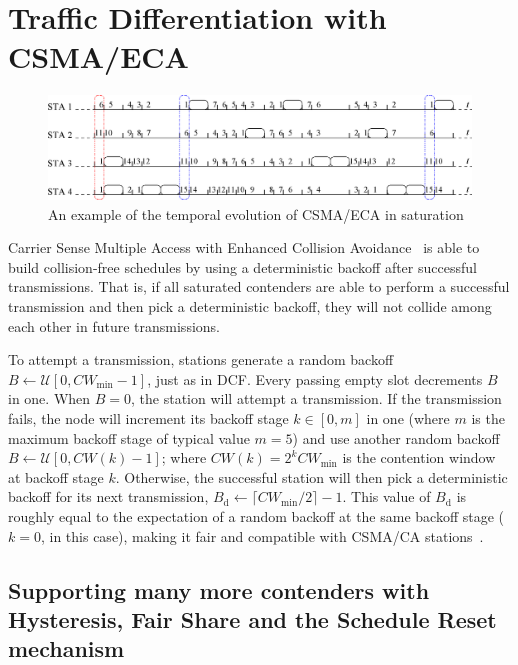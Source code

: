 \section{Traffic Differentiation with CSMA/ECA}\label{section3}

\begin{figure}[t!]
\centering
	\includegraphics[width=0.8\linewidth]{figures/csma_eca_different_backoff_short.eps}
	\caption{An example of the temporal evolution of CSMA/ECA in saturation}
	\label{fig:ECA}
\end{figure}
	
Carrier Sense Multiple Access with Enhanced Collision Avoidance~\cite{sanabria2014high, research2standards} is able to build collision-free schedules by using a deterministic backoff after successful transmissions. That is, if all saturated contenders are able to perform a successful transmission and then pick a deterministic backoff, they will not collide among each other in future transmissions.
	
To attempt a transmission, stations generate a random backoff $B\leftarrow\mathcal{U}[0,CW_{\min}-1]$, just as in DCF. Every passing empty slot decrements $B$ in one. When $B=0$, the station will attempt a transmission. If the transmission fails, the node will increment its backoff stage $k\in[0,m]$ in one (where $m$ is the maximum backoff stage of typical value $m=5$) and use another random backoff $B\leftarrow\mathcal{U}[0,CW(k)-1]$; where $CW(k)=2^{k}CW_{\min}$ is the contention window at backoff stage $k$. Otherwise, the successful station will then pick a deterministic backoff for its next transmission, $B_{\text{d}}\leftarrow \lceil CW_{\min}/2\rceil-1$. This value of $B_{\text{d}}$ is roughly equal to the expectation of a random backoff at the same backoff stage ($k=0$, in this case), making it fair and compatible with CSMA/CA stations~\cite{research2standards}.

\subsection{Supporting many more contenders with Hysteresis, Fair Share and the Schedule Reset mechanism}\label{scheduleReset}

